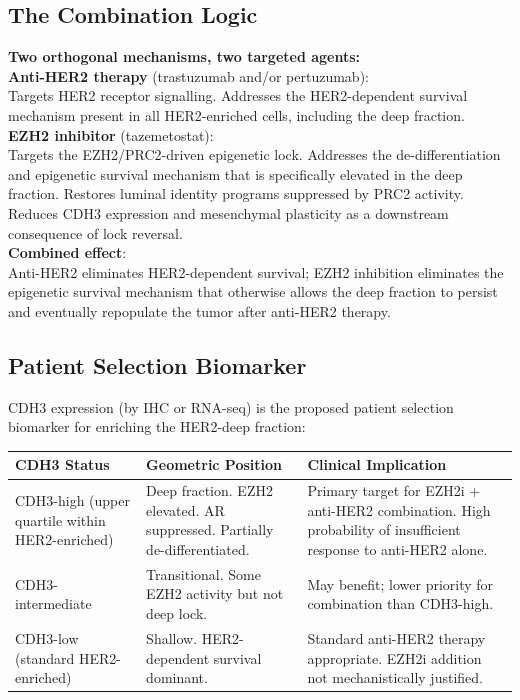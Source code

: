 \documentclass[12pt, a4paper]{article}
\begin{document}
\subsection{The Combination Logic}

\begin{center}
\colorbox{mechanismbox}{
\begin{minipage}{0.88\textwidth}
\vspace{0.5em}
\textbf{Two orthogonal mechanisms, two
targeted agents:}\\[0.5em]
\textbf{Anti-HER2 therapy} (trastuzumab
and/or pertuzumab):\\
Targets HER2 receptor signalling.
Addresses the HER2-dependent survival
mechanism present in all HER2-enriched
cells, including the deep fraction.\\[0.5em]
\textbf{EZH2 inhibitor} (tazemetostat):\\
Targets the EZH2/PRC2-driven epigenetic
lock. Addresses the de-differentiation
and epigenetic survival mechanism that
is specifically elevated in the deep
fraction. Restores luminal identity
programs suppressed by PRC2 activity.
Reduces CDH3 expression and mesenchymal
plasticity as a downstream consequence
of lock reversal.\\[0.5em]
\textbf{Combined effect}:\\
Anti-HER2 eliminates HER2-dependent
survival; EZH2 inhibition eliminates the
epigenetic survival mechanism that
otherwise allows the deep fraction to
persist and eventually repopulate the
tumor after anti-HER2 therapy.
\vspace{0.5em}
\end{minipage}}
\end{center}

\subsection{Patient Selection Biomarker}

CDH3 expression (by IHC or RNA-seq) is the
proposed patient selection biomarker for
enriching the HER2-deep fraction:

\begin{center}
\begin{tabular}{p{4cm}p{4cm}p{4.5cm}}
\toprule
\textbf{CDH3 Status} &
\textbf{Geometric Position} &
\textbf{Clinical Implication} \\
\midrule
CDH3-high (upper quartile
within HER2-enriched) &
Deep fraction. EZH2 elevated.
AR suppressed. Partially
de-differentiated. &
Primary target for EZH2i +
anti-HER2 combination.
High probability of
insufficient response
to anti-HER2 alone. \\[0.5em]
CDH3-intermediate &
Transitional. Some EZH2
activity but not deep lock. &
May benefit; lower priority
for combination than CDH3-high. \\[0.5em]
CDH3-low (standard
HER2-enriched) &
Shallow. HER2-dependent
survival dominant. &
Standard anti-HER2 therapy
appropriate. EZH2i addition
not mechanistically justified. \\
\bottomrule
\end{tabular}
\end{center}
\end{document}
